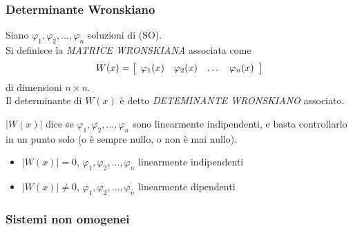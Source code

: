 \subsubsection{Determinante Wronskiano}
\begin{definition}
    Siano $\varphi_1, \varphi_2, \dotsc, \varphi_n$ soluzioni di (SO).\\
    Si definisce la \emph{MATRICE WRONSKIANA} associata come
    \begin{equation}
        W(x) = \left[\begin{array}{c c c c }
            \varphi_1(x) & \varphi_2(x) & \dotsc & \varphi_n(x)
        \end{array}\right]
    \end{equation}
    di dimensioni $n \times n$.\\
    Il determinante di $W(x)$ è detto \emph{DETEMINANTE WRONSKIANO} associato.
\end{definition}
$|W(x)|$ dice se $\varphi_1, \varphi_2, \dotsc, \varphi_n$ sono linearmente indipendenti, e basta controllarlo in un punto solo (o è sempre nullo, o non è mai nullo).
\begin{itemize}
    \item $|W(x)| = 0$, $\varphi_1, \varphi_2, \dotsc, \varphi_n$ linearmente indipendenti
    \item $|W(x)| \neq 0$, $\varphi_1, \varphi_2, \dotsc, \varphi_n$ linearmente dipendenti
\end{itemize}


\subsubsection{Sistemi non omogenei}